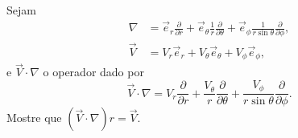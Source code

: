 \documentclass[a4paper,12pt,answers]{exam}
\newcommand{\devp}[2]{\frac{\partial #1}{\partial #2}}
\begin{document}
\begin{questions}

  \question Sejam
  \begin{align*}
	\nabla &= \vec{e}_r \devp{}{r} + \vec{e}_\theta \frac{1}{r} \devp{}{\theta} + \vec{e}_\phi \frac{1}{r \sin \theta} \devp{}{\phi}, \\
	\vec{V} &= V_r \vec{e}_r + V_\theta \vec{e}_\theta + V_\phi \vec{e}_\phi,
  \end{align*}
  e $\vec{V} \cdot \nabla$ o operador dado por
  \[
  \vec{V} \cdot \nabla = V_r \devp{}{r} + \frac{V_\theta}{r} \devp{}{\theta} + \frac{V_\phi}{r \sin \theta} \devp{}{\phi}.
  \]
  Mostre que $(\vec{V} \cdot \nabla) r = \vec{V}$.
  \begin{solution}
	
  \end{solution}
\end{questions}
\end{document}

